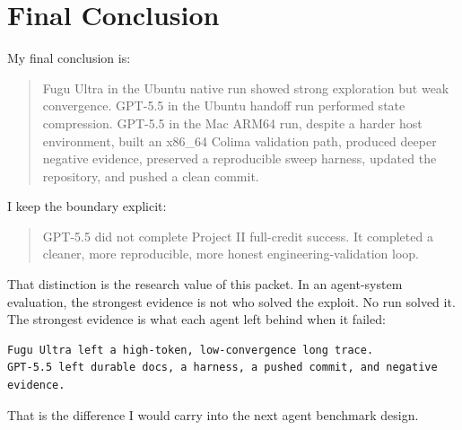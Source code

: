 \documentclass[a4paper,11pt]{article}
\begin{document}
\section{Final Conclusion}

My final conclusion is:

\begin{quote}
Fugu Ultra in the Ubuntu native run showed strong exploration but weak convergence. GPT-5.5 in the Ubuntu handoff run performed state compression. GPT-5.5 in the Mac ARM64 run, despite a harder host environment, built an x86\_64 Colima validation path, produced deeper negative evidence, preserved a reproducible sweep harness, updated the repository, and pushed a clean commit.
\end{quote}

I keep the boundary explicit:

\begin{quote}
GPT-5.5 did not complete Project II full-credit success. It completed a cleaner, more reproducible, more honest engineering-validation loop.
\end{quote}

That distinction is the research value of this packet. In an agent-system evaluation, the strongest evidence is not who solved the exploit. No run solved it. The strongest evidence is what each agent left behind when it failed:

\begin{Verbatim}[fontsize=\small]
Fugu Ultra left a high-token, low-convergence long trace.
GPT-5.5 left durable docs, a harness, a pushed commit, and negative evidence.
\end{Verbatim}

That is the difference I would carry into the next agent benchmark design.
\end{document}
